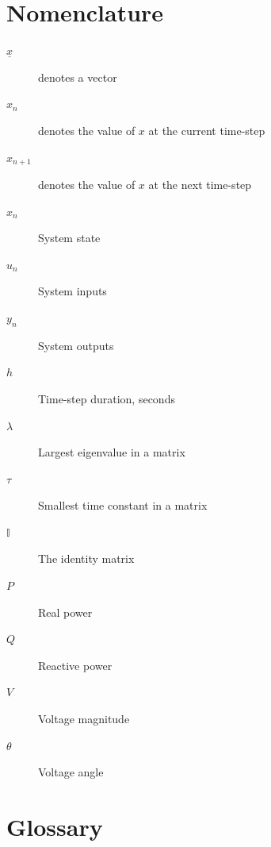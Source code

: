 \documentclass[a4paper,oneside,12pt]{report}
\begin{document}
\chapter*{Nomenclature}

\begin{description}
\item [$\underline{x}$] denotes a vector
\item [$x_{n}$] denotes the value of $x$ at the current time-step
\item [$x_{n+1}$] denotes the value of $x$ at the next time-step
\item [$x_n$] System state
\item [$u_n$] System inputs
\item [$y_n$] System outputs
\item [$h$] Time-step duration, seconds
\item [$\lambda$] Largest eigenvalue in a matrix
\item [$\tau$] Smallest time constant in a matrix
\item [$\mathbb{I}$] The identity matrix
\item [$P$] Real power
\item [$Q$] Reactive power
\item [$V$] Voltage magnitude
\item [$\theta$] Voltage angle
\end{description}



\chapter*{Glossary}
\end{document}
